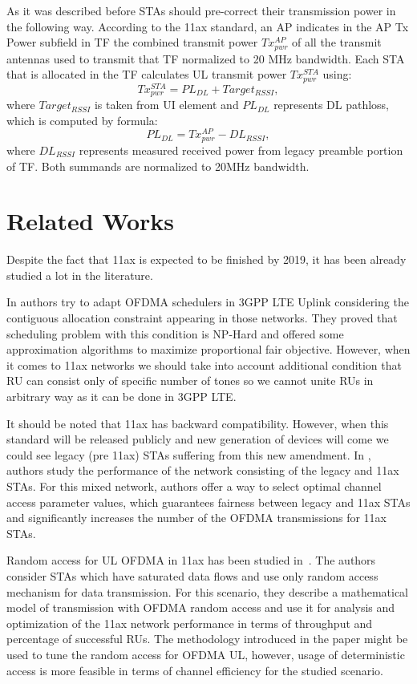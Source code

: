 As it was described before STAs should pre-correct their transmission power in the following way. 
According to the 11ax standard, an AP indicates in the AP Tx Power  subfield in TF the combined transmit power $Tx^{AP}_{pwr}$ of all the transmit antennas used to transmit that TF normalized to 20 MHz bandwidth. 
Each STA that is allocated in the TF calculates UL transmit power $Tx_{pwr}^{STA}$ using:
\begin{equation}
Tx_{pwr}^{STA} = PL_{DL} + Target_{RSSI},
\end{equation}
where $Target_{RSSI}$ is taken from UI element and $PL_{DL}$ represents DL pathloss, which is computed by formula:
\begin{equation}
PL_{DL} = Tx^{AP}_{pwr} - DL_{RSSI},
\end{equation}
where $DL_{RSSI}$ represents measured received power from legacy preamble portion of TF. Both summands are normalized to 20MHz bandwidth. 

\section{Related Works}
\label{sec:related}
Despite the fact that 11ax is expected to be finished by 2019, it has been already studied a lot in the literature.

In \cite{lee-proportionalfair} authors try to adapt OFDMA schedulers in 3GPP LTE Uplink considering the contiguous allocation constraint appearing in those networks. They proved that scheduling problem with this condition is NP-Hard and offered some approximation algorithms to maximize proportional fair objective. However, when it comes to 11ax networks we should take into account additional condition that RU can consist only of specific number of tones so we cannot unite RUs in arbitrary way as it can be done in 3GPP LTE. 

It should be noted that 11ax has backward compatibility. 
However, when this standard will be released publicly and new generation of devices will come we could see legacy (pre 11ax) STAs suffering from this new amendment. 
In \cite{khorov2016several}, authors study the performance of the network consisting of the legacy and 11ax STAs. 
For this mixed network, authors offer a way to select optimal channel access parameter values, which guarantees fairness between legacy and 11ax STAs and significantly increases the number of the OFDMA transmissions for 11ax STAs.

Random access for UL OFDMA in 11ax has been studied in~\cite{lanante2017performance}. 
The authors consider STAs which have saturated data flows and use only random access mechanism for data transmission. 
For this scenario, they describe a mathematical model of transmission with OFDMA random access and use it for analysis and optimization of the 11ax network performance in terms of throughput and percentage of successful RUs. 
The methodology introduced in the paper might be used to tune the random access for OFDMA UL, however, usage of deterministic access is more feasible in terms of channel efficiency for the studied scenario.

